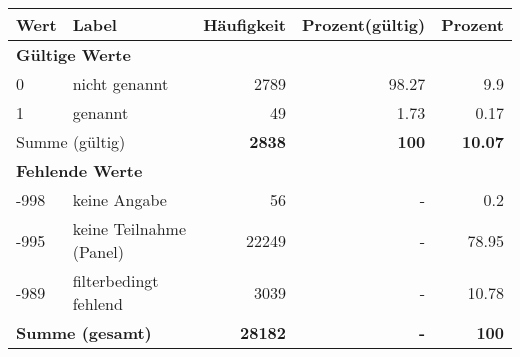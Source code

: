      \begin{longtable}{lXrrr}
     \toprule
     \textbf{Wert} & \textbf{Label} & \textbf{Häufigkeit} & \textbf{Prozent(gültig)} & \textbf{Prozent} \\
     \endhead
     \midrule
     \multicolumn{5}{l}{\textbf{Gültige Werte}}\\

     0 &
     \multicolumn{1}{X}{ nicht genannt   } &


       \num{2789} &
       \num[round-mode=places,round-precision=2]{98.27} &
         \num[round-mode=places,round-precision=2]{9.9} \\

     1 &
     \multicolumn{1}{X}{ genannt   } &


       \num{49} &
       \num[round-mode=places,round-precision=2]{1.73} &
         \num[round-mode=places,round-precision=2]{0.17} \\
     \midrule
     \multicolumn{2}{l}{Summe (gültig)} &
       \textbf{\num{2838}} &
     \textbf{\num{100}} &
       \textbf{\num[round-mode=places,round-precision=2]{10.07}} \\
     \multicolumn{5}{l}{\textbf{Fehlende Werte}}\\
       -998 &
       keine Angabe &
         \num{56} &
        - &
         \num[round-mode=places,round-precision=2]{0.2} \\
       -995 &
       keine Teilnahme (Panel) &
         \num{22249} &
        - &
         \num[round-mode=places,round-precision=2]{78.95} \\
       -989 &
       filterbedingt fehlend &
         \num{3039} &
        - &
         \num[round-mode=places,round-precision=2]{10.78} \\
     \midrule
     \multicolumn{2}{l}{\textbf{Summe (gesamt)}} &
          \textbf{\num{28182}} &
        \textbf{-} &
        \textbf{\num{100}} \\
     \bottomrule
     \end{longtable}
     
